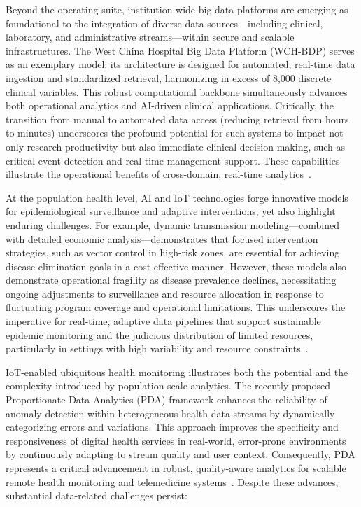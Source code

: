 Beyond the operating suite, institution-wide big data platforms are emerging as foundational to the integration of diverse data sources—including clinical, laboratory, and administrative streams—within secure and scalable infrastructures. The West China Hospital Big Data Platform (WCH-BDP) serves as an exemplary model: its architecture is designed for automated, real-time data ingestion and standardized retrieval, harmonizing in excess of 8,000 discrete clinical variables. This robust computational backbone simultaneously advances both operational analytics and AI-driven clinical applications. Critically, the transition from manual to automated data access (reducing retrieval from hours to minutes) underscores the profound potential for such systems to impact not only research productivity but also immediate clinical decision-making, such as critical event detection and real-time management support. These capabilities illustrate the operational benefits of cross-domain, real-time analytics~\cite{ref84}.

At the population health level, AI and IoT technologies forge innovative models for epidemiological surveillance and adaptive interventions, yet also highlight enduring challenges. For example, dynamic transmission modeling—combined with detailed economic analysis—demonstrates that focused intervention strategies, such as vector control in high-risk zones, are essential for achieving disease elimination goals in a cost-effective manner. However, these models also demonstrate operational fragility as disease prevalence declines, necessitating ongoing adjustments to surveillance and resource allocation in response to fluctuating program coverage and operational limitations. This underscores the imperative for real-time, adaptive data pipelines that support sustainable epidemic monitoring and the judicious distribution of limited resources, particularly in settings with high variability and resource constraints~\cite{ref61,ref63}.

IoT-enabled ubiquitous health monitoring illustrates both the potential and the complexity introduced by population-scale analytics. The recently proposed Proportionate Data Analytics (PDA) framework enhances the reliability of anomaly detection within heterogeneous health data streams by dynamically categorizing errors and variations. This approach improves the specificity and responsiveness of digital health services in real-world, error-prone environments by continuously adapting to stream quality and user context. Consequently, PDA represents a critical advancement in robust, quality-aware analytics for scalable remote health monitoring and telemedicine systems~\cite{ref79}. Despite these advances, substantial data-related challenges persist:

